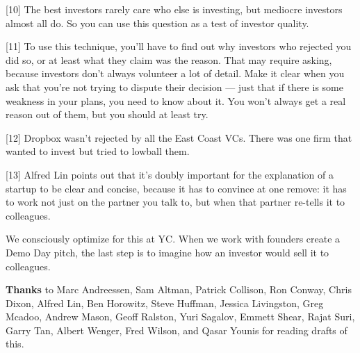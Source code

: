{[}10{]} The best investors rarely care who else is investing, but
mediocre investors almost all do. So you can use this question as a test
of investor quality.

{[}11{]} To use this technique, you'll have to find out why investors
who rejected you did so, or at least what they claim was the reason.
That may require asking, because investors don't always volunteer a lot
of detail. Make it clear when you ask that you're not trying to dispute
their decision --- just that if there is some weakness in your plans,
you need to know about it. You won't always get a real reason out of
them, but you should at least try.

{[}12{]} Dropbox wasn't rejected by all the East Coast VCs. There was
one firm that wanted to invest but tried to lowball them.

{[}13{]} Alfred Lin points out that it's doubly important for the
explanation of a startup to be clear and concise, because it has to
convince at one remove: it has to work not just on the partner you talk
to, but when that partner re-tells it to colleagues.

We consciously optimize for this at YC. When we work with founders
create a Demo Day pitch, the last step is to imagine how an investor
would sell it to colleagues.

\textbf{Thanks} to Marc Andreessen, Sam Altman, Patrick Collison, Ron
Conway, Chris Dixon, Alfred Lin, Ben Horowitz, Steve Huffman, Jessica
Livingston, Greg Mcadoo, Andrew Mason, Geoff Ralston, Yuri Sagalov,
Emmett Shear, Rajat Suri, Garry Tan, Albert Wenger, Fred Wilson, and
Qasar Younis for reading drafts of this.
